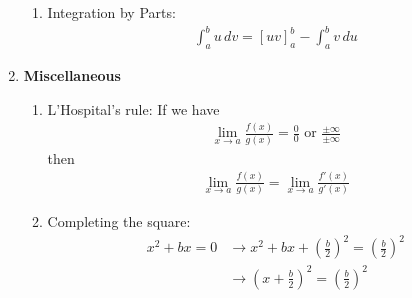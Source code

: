 \documentclass[10pt]{article}
\begin{document}
\begin{multicols}{2}
\begin{enumerate}
\begin{enumerate}
    \item Integration by Parts: 
    \begin{align*}
        \int_a^b u \, dv = [uv]_a^b - \int_a^b v \, du
    \end{align*}
    \end{enumerate}
    
    \item \textbf{Miscellaneous}
    \begin{enumerate}
        \item L’Hospital’s rule:
        If we have 
        \begin{align*}
            \lim_{x \rightarrow a} \frac{f(x)}{g(x)} = \frac{0}{0} \text{ or } \frac{\pm\infty}{\pm\infty}
        \end{align*}
        then 
        \begin{align*}
            \lim_{x \rightarrow a} \frac{f(x)}{g(x)} = \lim_{x \rightarrow a} \frac{f'(x)}{g'(x)}
        \end{align*}
        \item Completing the square: 
        \begin{align*}
            x^2 + bx = 0 &\rightarrow x^2 + bx + \left(\frac{b}{2}\right)^2 = \left(\frac{b}{2}\right)^2 \\ & \rightarrow \left(x+\frac{b}{2}\right)^2 = \left(\frac{b}{2}\right)^2
        \end{align*}
    \end{enumerate}
\end{enumerate}
\end{multicols}
\end{document}
